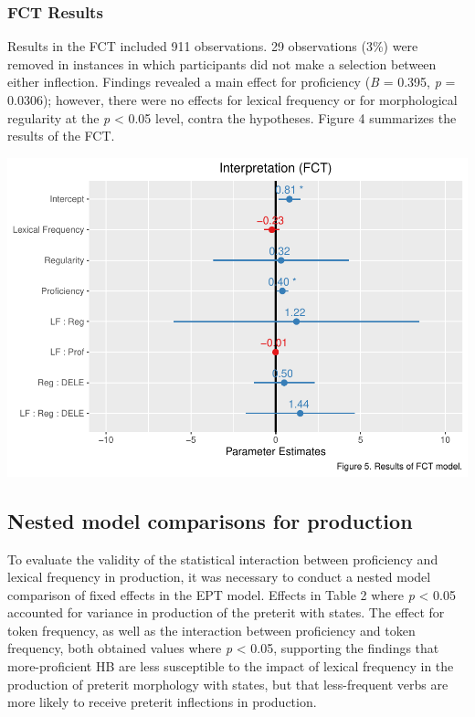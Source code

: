 \documentclass[
  english,
  man]{apa6}
\begin{document}
\hypertarget{fct-results}{%
\subsubsection{FCT Results}\label{fct-results}}

Results in the FCT included 911 observations. 29 observations (3\%) were removed in instances in which participants did not make a selection between either inflection. Findings revealed a main effect for proficiency (\emph{B} = 0.395, \emph{p} = 0.0306); however, there were no effects for lexical frequency or for morphological regularity at the \emph{p} \textless{} 0.05 level, contra the hypotheses. Figure 4 summarizes the results of the FCT.

\includegraphics{Manuscript_files/figure-latex/HB-FCT-model-1.pdf}

\hypertarget{nested-model-comparisons-for-production}{%
\subsection{Nested model comparisons for production}\label{nested-model-comparisons-for-production}}

To evaluate the validity of the statistical interaction between proficiency and lexical frequency in production, it was necessary to conduct a nested model comparison of fixed effects in the EPT model. Effects in Table 2 where \emph{p} \textless{} 0.05 accounted for variance in production of the preterit with states. The effect for token frequency, as well as the interaction between proficiency and token frequency, both obtained values where \emph{p} \textless{} 0.05, supporting the findings that more-proficient HB are less susceptible to the impact of lexical frequency in the production of preterit morphology with states, but that less-frequent verbs are more likely to receive preterit inflections in production.
\end{document}
